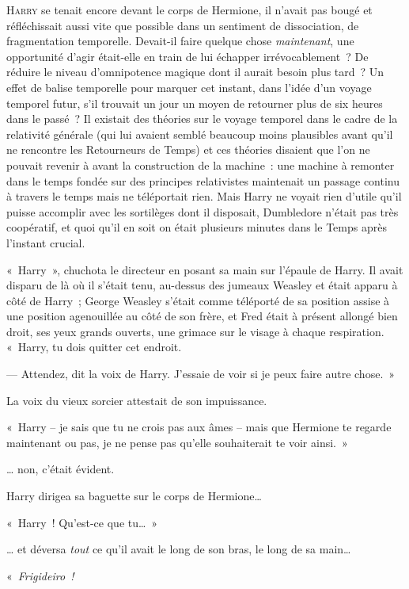 
\lettrine{H}{arry} se tenait encore devant le corps de Hermione, il n'avait pas bougé et réfléchissait aussi vite que possible dans un sentiment de dissociation, de fragmentation temporelle. Devait-il faire quelque chose \emph{maintenant}, une opportunité d'agir était-elle en train de lui échapper irrévocablement~? De réduire le niveau d'omnipotence magique dont il aurait besoin plus tard~? Un effet de balise temporelle pour marquer cet instant, dans l'idée d'un voyage temporel futur, s'il trouvait un jour un moyen de retourner plus de six heures dans le passé~? Il existait des théories sur le voyage temporel dans le cadre de la relativité générale (qui lui avaient semblé beaucoup moins plausibles avant qu'il ne rencontre les Retourneurs de Temps) et ces théories disaient que l'on ne pouvait revenir à avant la construction de la machine~: une machine à remonter dans le temps fondée sur des principes relativistes maintenait un passage continu à travers le temps mais ne téléportait rien. Mais Harry ne voyait rien d'utile qu'il puisse accomplir avec les sortilèges dont il disposait, Dumbledore n'était pas très coopératif, et quoi qu'il en soit on était plusieurs minutes dans le Temps après l'instant crucial.

«~Harry~», chuchota le directeur en posant sa main sur l'épaule de Harry. Il avait disparu de là où il s'était tenu, au-dessus des jumeaux Weasley et était apparu à côté de Harry~; George Weasley s'était comme téléporté de sa position assise à une position agenouillée au côté de son frère, et Fred était à présent allongé bien droit, ses yeux grands ouverts, une grimace sur le visage à chaque respiration. «~Harry, tu dois quitter cet endroit.

--- Attendez, dit la voix de Harry. J'essaie de voir si je peux faire autre chose.~»

La voix du vieux sorcier attestait de son impuissance.

«~Harry -- je sais que tu ne crois pas aux âmes -- mais que Hermione te regarde maintenant ou pas, je ne pense pas qu'elle souhaiterait te voir ainsi.~»

… non, c'était évident.

Harry dirigea sa baguette sur le corps de Hermione…

«~Harry~! Qu'est-ce que tu…~»

… et déversa \emph{tout} ce qu'il avait le long de son bras, le long de sa main…

«~\emph{Frigideiro~!}

